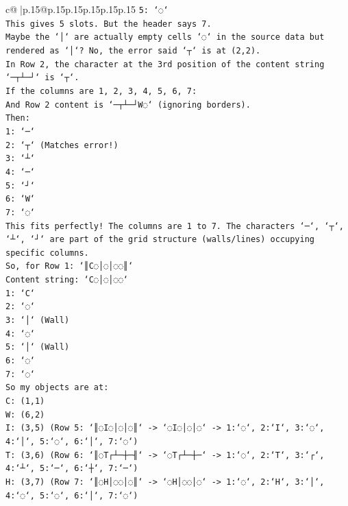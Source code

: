 \documentclass{article}
\begin{document}
{\begin{supertabular}{c@{$\;$}|p{.15\linewidth}@{}p{.15\linewidth}p{.15\linewidth}p{.15\linewidth}p{.15\linewidth}p{.15\linewidth}}
{{{\texttt{5: `◌`} \\
\texttt{This gives 5 slots. But the header says 7.} \\
\texttt{Maybe the `│` are actually empty cells `◌` in the source data but rendered as `│`? No, the error said `┬` is at (2,2).} \\
\texttt{In Row 2, the character at the 3rd position of the content string `─┬┴─┘` is `┬`.} \\
\texttt{If the columns are 1, 2, 3, 4, 5, 6, 7:} \\
\texttt{And Row 2 content is `─┬┴─┘W◌` (ignoring borders).} \\
\texttt{Then:} \\
\texttt{1: `─`} \\
\texttt{2: `┬` (Matches error!)} \\
\texttt{3: `┴`} \\
\texttt{4: `─`} \\
\texttt{5: `┘`} \\
\texttt{6: `W`} \\
\texttt{7: `◌`} \\
\texttt{This fits perfectly! The columns are 1 to 7. The characters `─`, `┬`, `┴`, `┘` are part of the grid structure (walls/lines) occupying specific columns.} \\
\texttt{So, for Row 1: `║C◌│◌│◌◌║`} \\
\texttt{Content string: `C◌│◌│◌◌`} \\
\texttt{1: `C`} \\
\texttt{2: `◌`} \\
\texttt{3: `│` (Wall)} \\
\texttt{4: `◌`} \\
\texttt{5: `│` (Wall)} \\
\texttt{6: `◌`} \\
\texttt{7: `◌`} \\
\texttt{So my objects are at:} \\
\texttt{C: (1,1)} \\
\texttt{W: (6,2)} \\
\texttt{I: (3,5) (Row 5: `║◌I◌│◌│◌║` {-}> `◌I◌│◌│◌` {-}> 1:`◌`, 2:`I`, 3:`◌`, 4:`│`, 5:`◌`, 6:`│`, 7:`◌`)} \\
\texttt{T: (3,6) (Row 6: `║◌T┌┴─┼─╢` {-}> `◌T┌┴─┼─` {-}> 1:`◌`, 2:`T`, 3:`┌`, 4:`┴`, 5:`─`, 6:`┼`, 7:`─`)} \\
\texttt{H: (3,7) (Row 7: `║◌H│◌◌│◌║` {-}> `◌H│◌◌│◌` {-}> 1:`◌`, 2:`H`, 3:`│`, 4:`◌`, 5:`◌`, 6:`│`, 7:`◌`)} \\
\\ 
}}}
\end{supertabular}}
\end{document}
